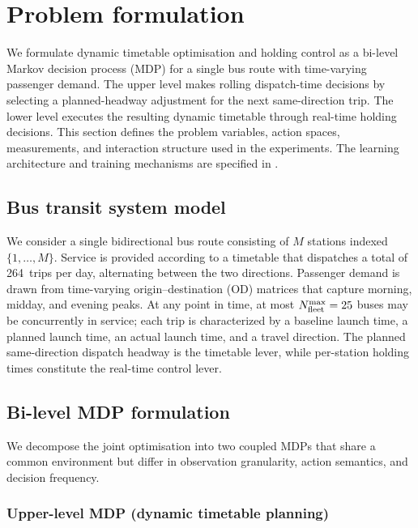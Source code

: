 \section{Problem formulation}
\label{sec:problem}

We formulate dynamic timetable optimisation and holding control as a bi-level Markov decision process (MDP) for a single bus route with time-varying passenger demand. The upper level makes rolling dispatch-time decisions by selecting a planned-headway adjustment for the next same-direction trip. The lower level executes the resulting dynamic timetable through real-time holding decisions.
This section defines the problem variables, action spaces, measurements, and interaction structure used in the experiments. The learning architecture and training mechanisms are specified in .

\subsection{Bus transit system model}
\label{sec:transit_model}

We consider a single bidirectional bus route consisting of $M$ stations indexed $\{1,\dots,M\}$.
Service is provided according to a timetable that dispatches a total of 264~trips per day, alternating between the two directions.
Passenger demand is drawn from time-varying origin--destination (OD) matrices that capture morning, midday, and evening peaks.
At any point in time, at most $N_{\mathrm{fleet}}^{\max}=25$ buses may be concurrently in service; each trip is characterized by a baseline launch time, a planned launch time, an actual launch time, and a travel direction.
The planned same-direction dispatch headway is the timetable lever, while per-station holding times constitute the real-time control lever.

\subsection{Bi-level MDP formulation}
\label{sec:bilevel_mdp}

We decompose the joint optimisation into two coupled MDPs that share a common environment but differ in observation granularity, action semantics, and decision frequency.

\subsubsection{Upper-level MDP (dynamic timetable planning)}
\label{sec:upper_mdp}

